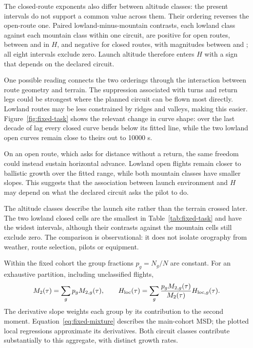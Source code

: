 The closed-route exponents also differ between altitude classes: the present intervals
do not support a common value across them. Their ordering reverses the open-route one.
Paired lowland-minus-mountain contrasts, each lowland class against each mountain class
within one circuit, are positive for open routes, between \ChThreeOpenAltShiftMin{} and
\ChThreeOpenAltShiftMax{} in $H$, and negative for closed routes, with magnitudes between
\ChThreeClosedAltShiftMin{} and \ChThreeClosedAltShiftMax; all eight intervals exclude
zero. Launch altitude therefore enters $H$ with a sign that depends on the declared
circuit.

One possible reading connects the two orderings through the interaction between
route geometry and terrain. The suppression associated with turns and return
legs could be strongest where the planned circuit can be flown most directly.
Lowland routes may be less constrained by ridges and valleys, making this easier.
Figure~\ref{fig:fixed-task} shows the relevant change in curve shape: over the last
decade of lag every closed curve bends below its fitted line, while the two
lowland open curves remain close to theirs out to 10000 s.

On an open route, which asks for distance without a return, the same freedom
could instead sustain horizontal advance. Lowland open flights remain closer to
ballistic growth over the fitted range, while both mountain classes have smaller
slopes. This suggests that the association between launch environment and $H$
may depend on what the declared circuit asks the pilot to do.

The altitude classes describe the launch site rather than the terrain crossed
later. The two lowland closed cells are the smallest in
Table~\ref{tab:fixed-task} and have the widest intervals, although their contrasts
against the mountain cells still exclude zero. The comparison is observational: it
does not isolate orography from weather, route selection, pilots or equipment.

Within the fixed cohort the group fractions $p_g=N_g/N$ are constant. For an
exhaustive partition, including unclassified flights,
\begin{equation}
 M_2(\tau)=\sum_g p_g M_{2,g}(\tau),\qquad
 H_{\rm loc}(\tau)=\sum_g
 \frac{p_gM_{2,g}(\tau)}{M_2(\tau)}H_{{\rm loc},g}(\tau).
 \label{eq:fixed-mixture}
\end{equation}
The derivative slope weights each group by its contribution to the second moment.
Equation~\eqref{eq:fixed-mixture} describes the main-cohort MSD; the plotted local
regressions approximate its derivatives. Both circuit classes contribute substantially
to this aggregate, with distinct growth rates.

